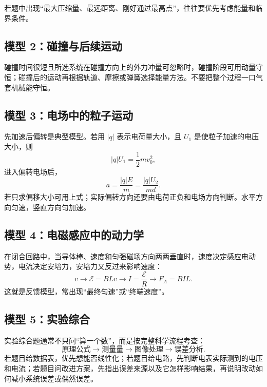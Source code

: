 若题中出现“最大压缩量、最远距离、刚好通过最高点”，往往要优先考虑能量和临界条件。

\subsection*{模型 2：碰撞与后续运动}

碰撞时间很短且所选系统在碰撞方向上的外力冲量可忽略时，碰撞阶段可用动量守恒；碰撞后的运动再根据轨道、摩擦或弹簧选择能量方法。不要把整个过程一口气套机械能守恒。

\subsection*{模型 3：电场中的粒子运动}

先加速后偏转是典型模型。若用 $|q|$ 表示电荷量大小，且 $U_1$ 是使粒子加速的电压大小，则
\[
|q|U_1=\frac12mv_0^2,
\]
进入偏转电场后，
\[
a=\frac{|q|E}{m}=\frac{|q|U_2}{md}.
\]
若只求偏移大小可用上式；实际偏转方向还要由电荷正负和电场方向判断。水平方向匀速，竖直方向匀加速。

\subsection*{模型 4：电磁感应中的动力学}

在闭合回路中，当导体棒、速度和匀强磁场方向两两垂直时，速度决定感应电动势，电流决定安培力，安培力又反过来影响速度：
\[
v\rightarrow \mathcal E=BLv\rightarrow I=\frac{\mathcal E}{R}\rightarrow F_A=BIL.
\]
这就是反馈模型，常出现“最终匀速”或“终端速度”。

\begin{center}


\label{fig:comprehensive-em-induction}
\end{center}

\subsection*{模型 5：实验综合}

实验综合题通常不只问“算一个数”，而是按完整科学流程考查：
\[
\text{原理公式}\rightarrow\text{测量量}\rightarrow\text{图像处理}\rightarrow\text{误差分析}.
\]
若题目给数据表，优先想能否线性化；若题目给电路，先判断电表实际测到的电压和电流；若题目问改进方案，先指出误差来源以及它怎样影响结果，再说明改动如何减小系统误差或偶然误差。

\begin{center}


\label{fig:experiment-model-review-day30}
\end{center}

